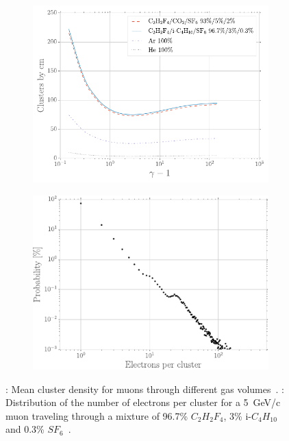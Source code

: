 	\begin{figure}[H]
		\begin{subfigure}{0.5\linewidth}
			\centering
			\includegraphics[width = \linewidth]{fig/chapt3/Cluster-distribution.pdf}
			\caption{\label{fig:ClusterDensity:A}}
		\end{subfigure}
		\begin{subfigure}{0.5\linewidth}
			\centering
			\includegraphics[width = \linewidth]{fig/chapt3/N_elec_cluster_RPC.pdf}
			\caption{\label{fig:ClusterDensity:B}}
		\end{subfigure}
		\caption{\label{fig:ClusterDensity} : Mean cluster density for muons through different gas volumes~\cite{VINCENT2017}. : Distribution of the number of electrons per cluster for a \SI{5}{GeV/c} muon traveling through a mixture of 96.7\% $C_2H_2F_4$, 3\% i-$C_4H_{10}$ and 0.3\% $SF_6$~\cite{VINCENT2017,RIEGLER2003}.}
	\end{figure}
	
